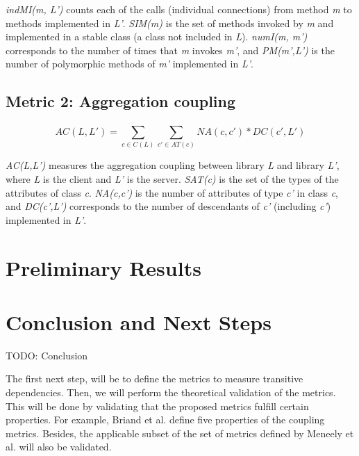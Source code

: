 \documentclass[a4paper]{article}
\begin{document}
\textit{indMI(m, L')} counts each of the calls (individual connections) from method \textit{m} to methods implemented in \textit{L'}. \textit{SIM(m)} is the set of methods invoked by \textit{m} and implemented in a stable class (a class not included in \textit{L}). \textit{numI(m, m')} corresponds to the number of times that \textit{m} invokes \textit{m'}, and \textit{PM(m',L')} is the number of polymorphic methods of \textit{m'} implemented in \textit{L'}.

\subsection{Metric 2: Aggregation coupling}
\[
  AC(L,L') = \sum_{c \in C(L)}^{} \sum_{c' \in AT(c)}^{} NA(c, c')*DC(c', L')
\]

\textit{AC(L,L')} measures the aggregation coupling between library \textit{L} and library \textit{L'}, where \textit{L} is the client and \textit{L'} is the server. \textit{SAT(c)} is the set of the types of the attributes of class \textit{c}. \textit{NA(c,c')} is the number of attributes of type \textit{c'} in class \textit{c}, and \textit{DC(c',L')} corresponds to the number of descendants of \textit{c'} (including \textit{c'}) implemented in \textit{L'}.



\section{Preliminary Results}



\section{Conclusion and Next Steps}
TODO: Conclusion

The first next step, will be to define the metrics to measure transitive dependencies. Then, we will perform the theoretical validation of the metrics. This will be done by validating that the proposed metrics fulfill certain properties. For example, Briand et al. \cite{briand1999unified} define five properties of the coupling metrics. Besides, the applicable subset of the set of metrics defined by Meneely et al. \cite{meneely2013validating} will also be validated.
\end{document}
